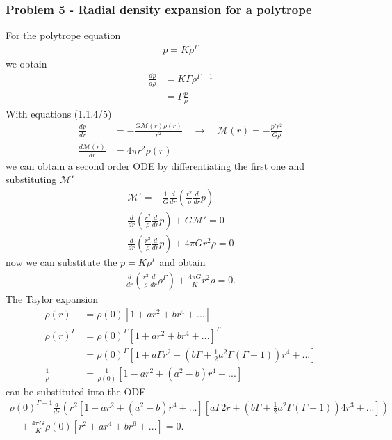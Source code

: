 \documentclass[10pt,a4paper]{article}
\theoremstyle{definition}
\begin{document}
\subsubsection{Problem 5 - Radial density expansion for a polytrope}
For the polytrope equation 
\begin{align}
    p=K\rho^\Gamma
\end{align}
we obtain
\begin{align}
    \frac{dp}{d\rho}&=K\Gamma\rho^{\Gamma-1}\\
    &=\Gamma\frac{p}{\rho}
\end{align}
With equations (1.1.4/5)
\begin{align}
    \frac{dp}{dr}   &= -\frac{G\mathcal{M}(r)\rho(r)}{r^2}\quad\rightarrow\quad\mathcal{M}(r)=-\frac{p'r^2}{G\rho}\\
    \frac{d\mathcal{M}(r)}{dr} &= 4\pi r^2\rho(r)
\end{align}
we can obtain a second order ODE by differentiating the first one and substituting $\mathcal{M}'$
\begin{align}
    \mathcal{M}'=-\frac{1}{G}\frac{d}{dr}\left(\frac{r^2}{\rho}\frac{d}{dr}p\right)\\
    \frac{d}{dr}\left(\frac{r^2}{\rho}\frac{d}{dr}p\right)+G\mathcal{M}'=0\\
    \frac{d}{dr}\left(\frac{r^2}{\rho}\frac{d}{dr}p\right)+4\pi Gr^2\rho=0
\end{align}
now we can substitute the $p=K\rho^\Gamma$ and obtain
\begin{align}
    \frac{d}{dr}\left(\frac{r^2}{\rho}\frac{d}{dr}\rho^\Gamma\right)+\frac{4\pi G}{K}r^2\rho=0.
\end{align}
The Taylor expansion 
\begin{align}
    \rho(r)&=\rho(0)\left[1+ar^2+br^4+...\right]\\
    \rho(r)^\Gamma&=\rho(0)^\Gamma\left[1+ar^2+br^4+...\right]^\Gamma\\
    &=\rho(0)^\Gamma\left[1+a\Gamma r^2+\left(b\Gamma+\frac{1}{2}a^2\Gamma(\Gamma-1)\right)r^4+...\right]\\
    \frac{1}{\rho}&=\frac{1}{\rho(0)}\left[1-a r^2+(a^2-b)r^4+...\right]
\end{align}
can be substituted into the ODE
\begin{align}
    \rho(0)^{\Gamma-1}\frac{d}{dr}\left(r^2\left[1-a r^2+(a^2-b)r^4+...\right]\left[a\Gamma 2r+\left(b\Gamma+\frac{1}{2}a^2\Gamma(\Gamma-1)\right)4r^3+...\right]\right)\\
    \quad+\frac{4\pi G}{K}\rho(0)\left[r^2+ar^4+br^6+...\right]=0.
\end{align}
\end{document}
